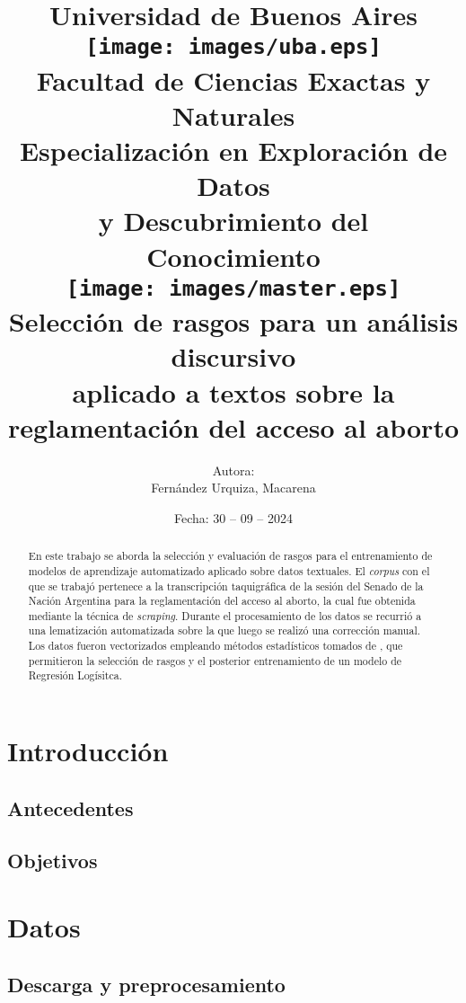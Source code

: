 \documentclass[colorinlistoftodos]{article}
\title{
    {\large Universidad de Buenos Aires\vspace{20pt}}\\
    {\texttt{[image: images/uba.eps]}}\\
    {\large\textbf{Facultad de Ciencias Exactas y Naturales}}\vspace{16pt}\\
    {\small\textbf{Especializaci\'on en Exploraci\'on de Datos\\y Descubrimiento del Conocimiento}\vspace{16pt}}\\
    {\texttt{[image: images/master.eps]}}\\
    {Selecci\'on de rasgos para un {an\'alisis} discursivo\\aplicado a textos sobre la reglamentaci\'on del acceso al aborto}
}
\author{Autora:\\Fern\'andez Urquiza, Macarena}
\date{Fecha: 30 -- 09 -- 2024}
\begin{document}
\clearpage\maketitle
\thispagestyle{empty}

\newpage
\tableofcontents

\newpage

\begin{abstract}
En este trabajo se aborda la selección y evaluación de rasgos para el
entrenamiento de modelos de aprendizaje automatizado aplicado sobre datos textuales.
El \textit{corpus} con el que se trabajó pertenece a la transcripción taquigráfica
de la sesión del Senado de la Nación Argentina para la reglamentación del acceso
al aborto, la cual fue obtenida mediante la técnica de \textit{scraping}. Durante el
procesamiento de los datos se recurrió a una lematización automatizada sobre la que
luego se realizó una corrección manual. Los datos fueron vectorizados empleando
métodos estadísticos tomados de \cite{monroe2008fightin}, que permitieron la selección
de rasgos y el posterior entrenamiento de un modelo de Regresión Logísitca.
\end{abstract}

\section{Introducci\'on}\label{section-intro}

\subsection{Antecedentes}\label{subsection-intro-background}


\subsection{Objetivos}\label{subsection-intro-objectives}



\section{Datos}\label{section-data}

\subsection{Descarga y preprocesamiento}\label{subsection-data-preprocessing}

\end{document}
